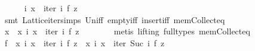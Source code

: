 \begin{isabellebody}
\ \ \ \ \isamarkupfalse%
\ {}{}i{}\ x\ {}\ iter\ i\ f\ z{}\isanewline
\ \ \ \ \ \ \isamarkupfalse%
\ {}smt\ Lattice{}iter{}simps{}{}{}\ Un{}iff\ empty{}iff\ insert{}iff\ mem{}Collect{}eq{}\isanewline
\ \ \ \ \isamarkupfalse%
\ {}x\ {}\ {}x{}\ {}i{}\ x\ {}\ iter\ i\ f\ z{}{}\isanewline
\ \ \ \ \ \ \isamarkupfalse%
\ {}metis\ {}lifting{}\ full{}types{}\ mem{}Collect{}eq{}\isanewline
\ \ \isamarkupfalse%
\isanewline
\ \ \isamarkupfalse%
\ {}{}f\ {}\ {}x{}\ {}{}i{}\ x\ {}\ iter\ i\ f\ z{}{}{}\ {}\ {}x{}\ {}{}i{}\ x\ {}\ iter\ {}Suc\ i{}\ f\ z{}{}{}\isanewline

\end{isabellebody}

